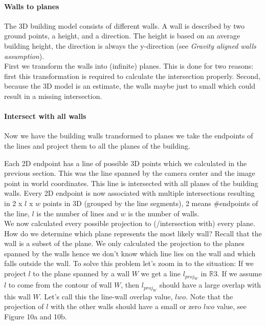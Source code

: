 	\paragraph{Walls to planes}
	The 3D building model consists of different walls. A wall is described by
	two ground points, a height, and a direction.
	The height is based on an average building height, the direction is always the
	y-direction (see \emph{Gravity aligned walls assumption}).\\
	First we transform the walls into (infinite) planes.  This is done for two
	reasons: first this transformation is required to calculate the intersection
	properly. Second, because the 3D model is an estimate, the walls maybe just
	to small which could result in a missing intersection. \\


	\paragraph{Intersect with all walls}
	Now we have the building walls transformed to planes we take the endpoints of the
	lines and project them to all the planes of the building.  

	Each 2D endpoint has a line of possible 3D points which we calculated in the
	previous section. This was the line spanned by the camera center and the
	image point in world coordinates.
	This line is intersected with all planes of the building walls. Every 2D
	endpoint is now associated with multiple intersections resulting in 2 x
	$l$ x $w$ points in 3D (grouped by the line segments), 2 means
	\#endpoints of the line, $l$ is the number of lines and $w$ is the number of
	walls.\\

	We now calculated every possible projection to (/intersection with) every plane. How do we
	determine which plane represents the most likely wall?  
	Recall that the wall is a subset of the plane.  We only calculated the projection to the
	planes spanned by the walls hence we don't know which line lies on
	the wall and which falls outside the wall. To solve this problem let's
	zoom in to the situation:
	If we project $l$ to the plane spanned
	by a wall $W$ we get a line $l_{proj_W}$ in $\mathbb{R}3$.  If we assume
	$l$ to come from the contour of wall $W$, then $l_{proj_W}$ should have a large
	overlap with this wall $W$.  Let's call this the line-wall overlap value, $lwo$.  
	Note that the projection of $l$ with the
	other walls should have a small or zero $lwo$ value, see Figure 10a and 10b.\\

